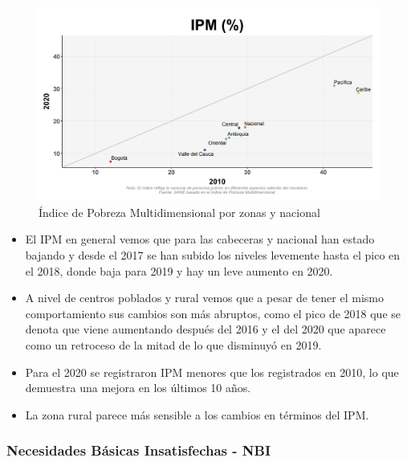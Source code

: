     \begin{figure}[H]
        \caption{Índice de Pobreza Multidimensional por zonas y nacional \label{map_result_2} }
        \begin{center}
        \includegraphics[width=\textwidth,keepaspectratio]{img/var_270_scatter_time.png}
        \end{center}
    \end{figure}
            \begin{itemize}
                    \item El IPM en general vemos que para las cabeceras y nacional han estado bajando y desde el 2017 se han subido los niveles levemente hasta el pico en el 2018, donde baja para 2019 y hay un leve aumento en 2020.
                    \item A nivel de centros poblados y rural vemos que a pesar de tener el mismo comportamiento sus cambios son más abruptos, como el pico de 2018 que se denota que viene aumentando después del 2016 y el del 2020 que aparece como un retroceso de la mitad de lo que disminuyó en 2019.
                    \item Para el 2020 se registraron IPM menores que los registrados en 2010, lo que demuestra una mejora en los últimos 10 años.
                    \item La zona rural parece más sensible a los cambios en términos del IPM.
                    \end{itemize}

        \subsubsection{Necesidades Básicas Insatisfechas - NBI}
        

